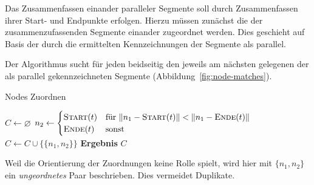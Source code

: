 \documentclass[../main/thesis.tex]{subfiles}
\begin{document}
Das Zusammenfassen einander paralleler Segmente soll durch Zusammenfassen ihrer Start- und Endpunkte erfolgen.
Hierzu müssen zunächst die  der zusammenzufassenden Segmente einander zugeordnet werden.
Dies geschieht auf Basis der durch die  ermittelten Kennzeichnungen der Segmente als parallel.

Der Algorithmus  sucht für jeden  beidseitig den jeweils am nächsten gelegenen  der als parallel gekennzeichneten Segmente (Abbildung~\ref{fig:node-matches}).

\begin{algorithmhere}{Nodes Zuordnen}
\label{alg:Zuordnen}
\begin{algorithmic}
	\State $C \gets \varnothing$
				\State $n_2 \gets \begin{cases}\textproc{Start}(t) & \text{für } \abs n_1 - \textproc{Start}(t)\abs < \abs n_1 - \textproc{Ende}(t)\abs\\\textproc{Ende}(t) & \text{sonst}\end{cases}$
				\State $C \gets C \cup \{\{n_1, n_2\}\}$
			\EndFor
		\EndFor
	\EndFor
	\State \textbf{Ergebnis} $C$
\EndFunction
\end{algorithmic}
\end{algorithmhere}


Weil die Orientierung der Zuordnungen keine Rolle spielt, wird hier mit $\{n_1, n_2\}$ ein \emph{ungeordnetes} Paar beschrieben.
Dies vermeidet Duplikate.

\end{document}
